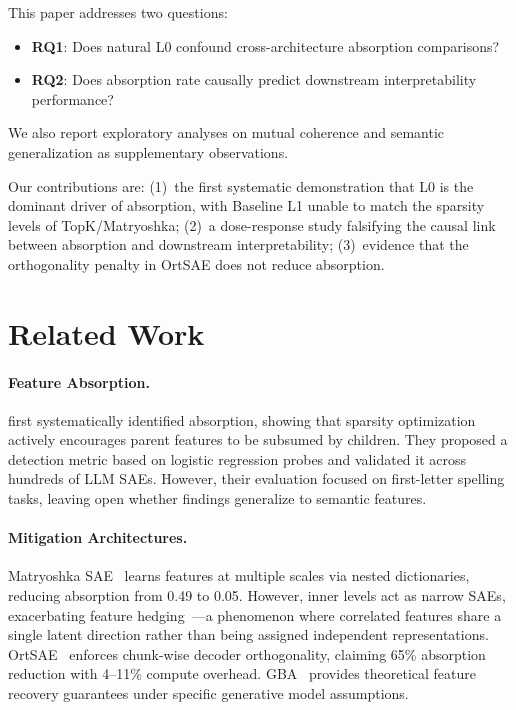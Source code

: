 \documentclass{article}
\begin{document}
This paper addresses two questions:
\begin{itemize}
    \item \textbf{RQ1}: Does natural L0 confound cross-architecture absorption comparisons?
    \item \textbf{RQ2}: Does absorption rate causally predict downstream interpretability performance?
\end{itemize}
We also report exploratory analyses on mutual coherence and semantic generalization as supplementary observations.

Our contributions are: (1)~the first systematic demonstration that L0 is the dominant driver of absorption, with Baseline L1 unable to match the sparsity levels of TopK/Matryoshka; (2)~a dose-response study falsifying the causal link between absorption and downstream interpretability; (3)~evidence that the orthogonality penalty in OrtSAE does not reduce absorption.

\section{Related Work}

\paragraph{Feature Absorption.} \citet{chanin2024absorption} first systematically identified absorption, showing that sparsity optimization actively encourages parent features to be subsumed by children. They proposed a detection metric based on logistic regression probes and validated it across hundreds of LLM SAEs. However, their evaluation focused on first-letter spelling tasks, leaving open whether findings generalize to semantic features.

\paragraph{Mitigation Architectures.} Matryoshka SAE~\citep{bussmann2025matryoshka} learns features at multiple scales via nested dictionaries, reducing absorption from 0.49 to 0.05. However, inner levels act as narrow SAEs, exacerbating feature hedging~\citep{bussmann2025hedging}---a phenomenon where correlated features share a single latent direction rather than being assigned independent representations. OrtSAE~\citep{anonymous2025ortsae} enforces chunk-wise decoder orthogonality, claiming 65\% absorption reduction with 4--11\% compute overhead. GBA~\citep{anonymous2025gba} provides theoretical feature recovery guarantees under specific generative model assumptions.
\end{document}
